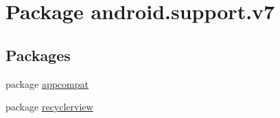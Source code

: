 \hypertarget{namespaceandroid_1_1support_1_1v7}{}\section{Package android.\+support.\+v7}
\label{namespaceandroid_1_1support_1_1v7}
\subsection*{Packages}
\begin{DoxyCompactItemize}
\item 
package \mbox{\hyperlink{namespaceandroid_1_1support_1_1v7_1_1appcompat}{appcompat}}
\item 
package \mbox{\hyperlink{namespaceandroid_1_1support_1_1v7_1_1recyclerview}{recyclerview}}
\end{DoxyCompactItemize}

